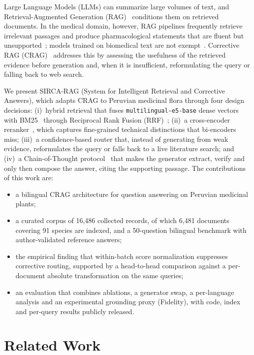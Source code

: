 \documentclass[runningheads]{llncs}
\newcommand{\sirca}{\textsc{SIRCA-RAG}}
\begin{document}
Large Language Models (LLMs) can summarize large volumes of text, and Retrieval-Augmented Generation (RAG)~\cite{lewis2020retrieval} conditions them on retrieved documents. In the medical domain, however, RAG pipelines frequently retrieve irrelevant passages and produce pharmacological statements that are fluent but unsupported~\cite{gao2024retrieval,ji2023survey}; models trained on biomedical text are not exempt~\cite{gu2021domain,lee2020biobert}. Corrective RAG (CRAG)~\cite{yan2024crag} addresses this by assessing the usefulness of the retrieved evidence before generation and, when it is insufficient, reformulating the query or falling back to web search.

We present \sirca{} (System for Intelligent Retrieval and Corrective Answers), which adapts CRAG to Peruvian medicinal flora through four design decisions: (i)~hybrid retrieval that fuses \texttt{multilingual-e5-base} dense vectors~\cite{wang2024e5} with BM25~\cite{robertson2009bm25} through Reciprocal Rank Fusion (RRF)~\cite{cormack2009rrf}; (ii)~a cross-encoder reranker~\cite{nogueira2019passage}, which captures fine-grained technical distinctions that bi-encoders miss; (iii)~a confidence-based router that, instead of generating from weak evidence, reformulates the query or falls back to a live literature search; and (iv)~a Chain-of-Thought protocol~\cite{wei2022chain} that makes the generator extract, verify and only then compose the answer, citing the supporting passage. The contributions of this work are:
\begin{itemize}[leftmargin=*,itemsep=1pt,topsep=2pt]
  \item a bilingual CRAG architecture for question answering on Peruvian medicinal plants;
  \item a curated corpus of 16,486 collected records, of which 6,481 documents covering 91 species are indexed, and a 50-question bilingual benchmark with author-validated reference answers;
  \item the empirical finding that within-batch score normalization suppresses corrective routing, supported by a head-to-head comparison against a per-document absolute transformation on the same queries;
  \item an evaluation that combines ablations, a generator swap, a per-language analysis and an experimental grounding proxy (Fidelity), with code, index and per-query results publicly released.
\end{itemize}

\section{Related Work}
\label{sec:related}
\end{document}
